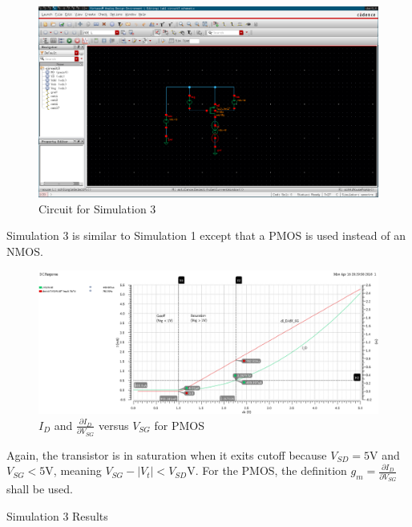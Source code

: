 \FloatBarrier

\begin{figure}[h!]
	\centering
	\includegraphics[scale=0.30]{../images/circuit3.PNG}
	\caption{Circuit for Simulation 3}
	\label{fig:circuit3}
\end{figure}

\FloatBarrier

Simulation 3 is similar to Simulation 1 except that a PMOS is used instead of an NMOS.

\FloatBarrier

\begin{figure}[h!]
	\centering
	\includegraphics[scale=0.30]{../images/500ua_point_pmos.PNG}
	\caption{$I_{D}$ and $\frac{\partial I_{D}}{\partial V_{SG}}$ versus $V_{SG}$ for PMOS}
	\label{fig:id_vs_vgs_pmos}
\end{figure}

\FloatBarrier

Again, the transistor is in saturation when it exits cutoff because $V_{SD} = 5$\si{\volt} and $V_{SG} < 5$\si{\volt}, meaning $V_{SG} - |V_{t}| < V_{SD}$\si{\volt}.
For the PMOS, the definition $g_{m} = \frac{\partial I_{D}}{\partial V_{SG}}$ shall be used.

\FloatBarrier

\begin{table}[h!]
	\centering
	\caption{Simulation 3 Results}
	\label{tab:sim3_results}
\end{table}

\FloatBarrier

